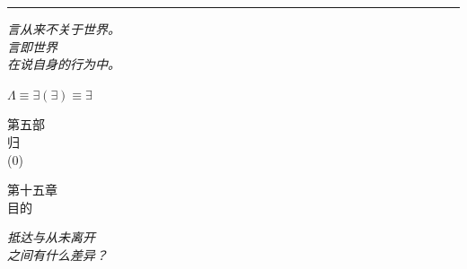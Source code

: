 \documentclass[10pt, openany, oneside]{book}
\renewcommand{\normalsize}{\fontsize{10}{13}\selectfont}
\renewcommand{\large}{\fontsize{11.5}{14}\selectfont}
\renewcommand{\LARGE}{\fontsize{15}{18}\selectfont}
\renewcommand{\huge}{\fontsize{17}{21}\selectfont}
\begin{document}
\vspace{2em}

\begin{center}
    \rule{0.15\textwidth}{0.3pt}
\end{center}

\vspace{0.5em}

\begin{center}
    \itshape
    言从来不关于世界。\\
    言即世界\\
    在说自身的行为中。
\end{center}

\vspace{0.5em}

\begin{center}
    $\Lambda \equiv \exists(\exists) \equiv \exists$
\end{center}


%
%

\newpage
\thispagestyle{empty}
\vspace*{\fill}
\begin{center}
    {\LARGE\scshape 第五部}\\[1em]
    {\large\scshape 归}\\[0.5em]
    {\normalsize ($0$)}
\end{center}
\vspace*{\fill}
\newpage

%
%
%

\newpage

\begin{center}
    {\huge\scshape 第十五章}\\[0.3em]
    {\large\scshape 目的}
\end{center}

\vspace{1.5em}

\begin{center}
    \itshape
    抵达与从未离开\\
    之间有什么差异？
\end{center}
\end{document}
